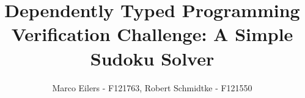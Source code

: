 \documentclass[a4paper,11pt]{article}
\begin{document}
\title{Dependently Typed Programming\\Verification Challenge: A Simple Sudoku Solver}
\author{Marco Eilers - F121763, Robert Schmidtke - F121550}

\maketitle
\newpage


\end{document}
